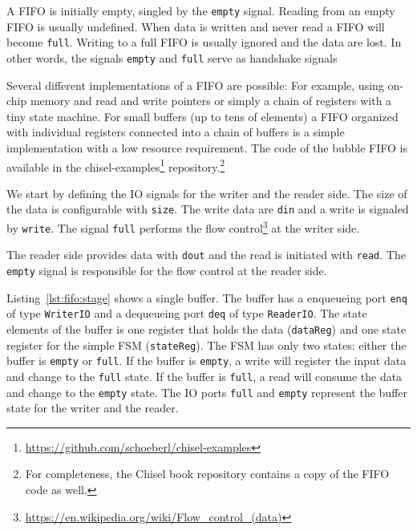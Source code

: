 \documentclass[%
    10pt,
    headinclude, footexclude,
    openright, %
    notitlepage,
    cleardoubleempty,
    headsepline,
    pointlessnumbers,
    bibtotoc, idxtotoc,
    ]{scrbook}
\newcommand{\code}[1]{{\lstinline[basicstyle=\small\ttfamily]{#1}}}
\newcommand{\myref}[2]{\href{#1}{#2}}
\renewcommand{\myref}[2]{{#2}{\footnote{\url{#1}}}}
\begin{document}
A FIFO is initially empty, singled by the \code{empty} signal. Reading
from an empty FIFO is usually undefined. When data is written and never
read a FIFO will become \code{full}. Writing to a full FIFO is usually ignored
and the data are lost. In other words, the signals \code{empty} and \code{full}
serve as handshake signals

Several different implementations of a FIFO are possible: For example, using on-chip
memory and read and write pointers or simply a chain of registers with a
tiny state machine. For small buffers (up to tens of elements) a FIFO organized
with individual registers connected into a chain of buffers is a simple
implementation with a low resource requirement.
The code of the bubble FIFO is available in the
\myref{https://github.com/schoeberl/chisel-examples}{chisel-examples}
repository.\footnote{For completeness, the Chisel book repository contains
a copy of the FIFO code as well.}

We start by defining the IO signals for the writer and the reader side.
The size of the data is configurable with \code{size}.
The write data are \code{din} and a write is signaled by \code{write}.
The signal \code{full} performs the
\myref{https://en.wikipedia.org/wiki/Flow_control_(data)}{flow control}
at the writer side.


The reader side provides data with \code{dout} and the read is initiated
with \code{read}. The \code{empty} signal is responsible for the flow control
at the reader side.


Listing~\ref{lst:fifo:stage} shows a single buffer. The buffer has a enqueueing port
\code{enq} of type \code{WriterIO} and a dequeueing port \code{deq} of type
\code{ReaderIO}. The state elements of the buffer is one register that holds the
data (\code{dataReg}) and one state register for the simple FSM (\code{stateReg}).
The FSM has only two states: either the buffer is \code{empty} or \code{full}.
If the buffer is \code{empty}, a write will register the input data and change
to the \code{full} state.
If the buffer is \code{full}, a read will consume the data and change to the
\code{empty} state.
The IO ports \code{full} and \code{empty} represent the buffer state for
the writer and the reader.

\end{document}
